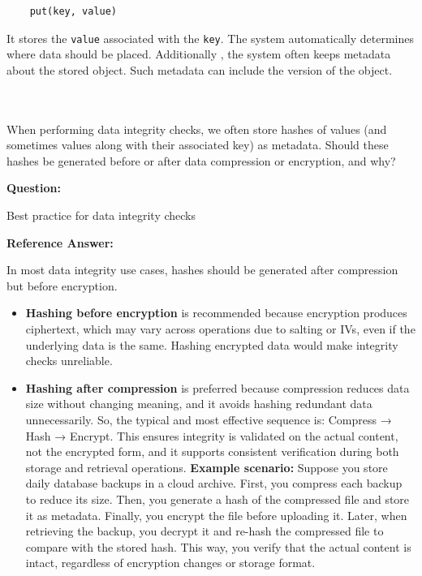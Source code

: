\begin{verbatim}
	put(key, value)
\end{verbatim}

It stores the \texttt{value} associated with the \texttt{key}. The system automatically determines where data should be placed. Additionally , the system often keeps metadata about the stored object. Such metadata can include the version of the object.

\begin{table}[htbp]
\centering
\small
{}
\end{table}
\\
\\
When performing data integrity checks, we often store hashes of values (and sometimes values along with their associated key) as metadata. Should these hashes be generated before or after data compression or encryption, and why?

\textbf{Question:}

Best practice for data integrity checks

\textbf{Reference Answer:}

In most data integrity use cases, hashes should be generated after compression but before encryption.

\begin{itemize}
\tightlist
\item
\textbf{Hashing before encryption} is recommended because encryption produces ciphertext, which may vary across operations due to salting or IVs, even if the underlying data is the same. Hashing encrypted data would make integrity checks unreliable.
\item
\textbf{Hashing after compression} is preferred because compression reduces data size without changing meaning, and it avoids hashing redundant data unnecessarily. So, the typical and most effective sequence is: Compress → Hash → Encrypt. This ensures integrity is validated on the actual content, not the encrypted form, and it supports consistent verification during both storage and retrieval operations. \textbf{Example scenario:} Suppose you store daily database backups in a cloud archive. First, you compress each backup to reduce its size. Then, you generate a hash of the compressed file and store it as metadata. Finally, you encrypt the file before uploading it. Later, when retrieving the backup, you decrypt it and re-hash the compressed file to compare with the stored hash. This way, you verify that the actual content is intact, regardless of encryption changes or storage format.
\end{itemize}

